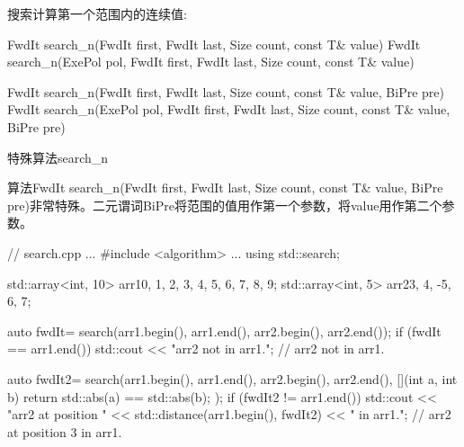 搜索计算第一个范围内的连续值:

\begin{cpp}
FwdIt search_n(FwdIt first, FwdIt last, Size count, const T& value)
FwdIt search_n(ExePol pol, FwdIt first, FwdIt last, Size count, const T& value)

FwdIt search_n(FwdIt first, FwdIt last, Size count, const T& value, BiPre pre)
FwdIt search_n(ExePol pol, FwdIt first,
			   FwdIt last, Size count, const T& value, BiPre pre)
\end{cpp}

\begin{myWarning}{特殊算法search\_n}
	
算法FwdIt search\_n(FwdIt first, FwdIt last, Size count, const T\& value, BiPre pre)非常特殊。二元谓词BiPre将范围的值用作第一个参数，将value用作第二个参数。
\end{myWarning}


\begin{cpp}
// search.cpp
...
#include <algorithm>
...
using std::search;

std::array<int, 10> arr1{0, 1, 2, 3, 4, 5, 6, 7, 8, 9};
std::array<int, 5> arr2{3, 4, -5, 6, 7};

auto fwdIt= search(arr1.begin(), arr1.end(), arr2.begin(), arr2.end());
if (fwdIt == arr1.end()) std::cout << "arr2 not in arr1."; // arr2 not in arr1.

auto fwdIt2= search(arr1.begin(), arr1.end(), arr2.begin(), arr2.end(),
					[](int a, int b){ return std::abs(a) == std::abs(b); });
if (fwdIt2 != arr1.end()) std::cout << "arr2 at position "
					<< std::distance(arr1.begin(), fwdIt2) << " in arr1.";
													// arr2 at position 3 in arr1.
\end{cpp}









